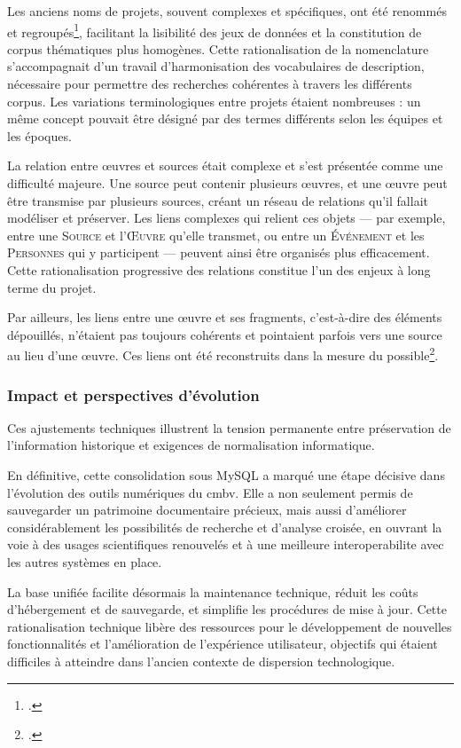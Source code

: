 Les anciens noms de projets, souvent complexes et spécifiques, ont été renommés et regroupés\footcite{laurentguilloRapportMigrationAnciennes2022}, facilitant la lisibilité des jeux de données et la constitution de corpus thématiques plus homogènes. Cette rationalisation de la nomenclature s'accompagnait d'un travail d'harmonisation des vocabulaires de description, nécessaire pour permettre des recherches cohérentes à travers les différents corpus. Les variations terminologiques entre projets étaient nombreuses : un même concept pouvait être désigné par des termes différents selon les équipes et les époques.

La relation  entre œuvres et sources était complexe et s'est présentée comme une difficulté majeure. Une source peut contenir plusieurs œuvres, et une œuvre peut être transmise par plusieurs sources, créant un réseau de relations qu'il fallait modéliser et préserver. Les liens complexes qui relient ces objets --- par exemple, entre une \textsc{Source} et l'\textsc{Œuvre} qu'elle transmet, ou entre un \textsc{Événement} et les \textsc{Personnes} qui y participent --- peuvent ainsi être organisés plus efficacement. Cette rationalisation progressive des relations constitue l'un des enjeux à long terme du projet.

Par ailleurs, les liens entre une œuvre et ses fragments, c'est-à-dire des éléments dépouillés, n'étaient pas toujours cohérents et pointaient parfois vers une source au lieu d'une œuvre. Ces liens ont été reconstruits dans la mesure du possible\footcite{laurentguilloRapportMigrationAnciennes2022}.

\subsubsection{Impact et perspectives d'évolution}

Ces ajustements techniques illustrent la tension permanente entre préservation de l'information historique et exigences de normalisation informatique.

En définitive, cette consolidation sous MySQL a marqué une étape décisive dans l'évolution des outils numériques du \gls{cmbv}. Elle a non seulement permis de sauvegarder un patrimoine documentaire précieux, mais aussi d'améliorer considérablement les possibilités de recherche et d'analyse croisée, en ouvrant la voie à des usages scientifiques renouvelés et à une meilleure \gls{interoperabilite} avec les autres systèmes en place.

La base unifiée facilite désormais la maintenance technique, réduit les coûts d'hébergement et de sauvegarde, et simplifie les procédures de mise à jour. Cette rationalisation technique libère des ressources pour le développement de nouvelles fonctionnalités et l'amélioration de l'expérience utilisateur, objectifs qui étaient difficiles à atteindre dans l'ancien contexte de dispersion technologique.

